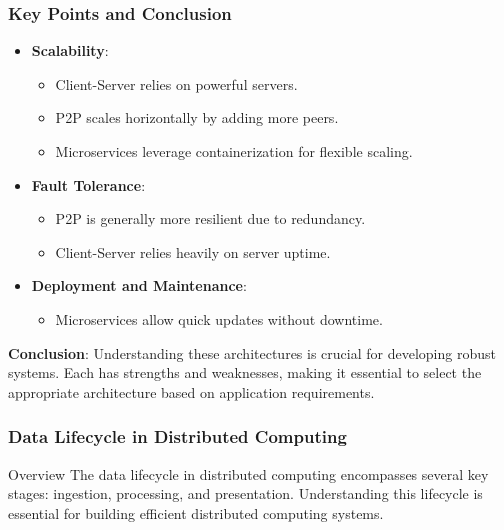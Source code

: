 \documentclass[aspectratio=169]{beamer}
\begin{document}
\begin{frame}[fragile]
    \frametitle{Key Points and Conclusion}
    \begin{itemize}
        \item \textbf{Scalability}:
        \begin{itemize}
            \item Client-Server relies on powerful servers.
            \item P2P scales horizontally by adding more peers.
            \item Microservices leverage containerization for flexible scaling.
        \end{itemize}
        \item \textbf{Fault Tolerance}:
        \begin{itemize}
            \item P2P is generally more resilient due to redundancy.
            \item Client-Server relies heavily on server uptime.
        \end{itemize}
        \item \textbf{Deployment and Maintenance}:
        \begin{itemize}
            \item Microservices allow quick updates without downtime.
        \end{itemize}
    \end{itemize}
    
    \textbf{Conclusion}: Understanding these architectures is crucial for developing robust systems. Each has strengths and weaknesses, making it essential to select the appropriate architecture based on application requirements.
\end{frame}

\begin{frame}
    \frametitle{Data Lifecycle in Distributed Computing}
    \begin{block}{Overview}
        The data lifecycle in distributed computing encompasses several key stages: 
        ingestion, processing, and presentation. Understanding this lifecycle is essential for building efficient distributed computing systems.
    \end{block}
\end{frame}
\end{document}
